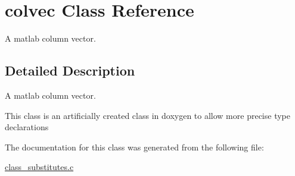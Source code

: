 \hypertarget{a00004}{\section{colvec Class Reference}
\label{a00004}
}


A matlab column vector.  




\subsection{Detailed Description}
A matlab column vector. 

This class is an artificially created class in doxygen to allow more precise type declarations 

The documentation for this class was generated from the following file\-:\begin{DoxyCompactItemize}
\item 
\hyperlink{a00016}{class\-\_\-substitutes.\-c}\end{DoxyCompactItemize}
